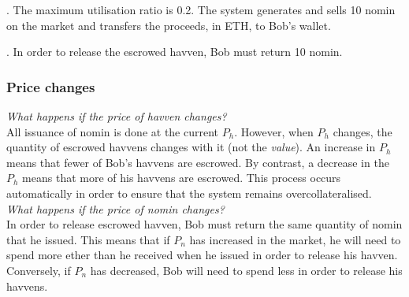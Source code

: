 \begin{center}
\end{center}

. The maximum utilisation ratio is 0.2. The system generates and sells 10 nomin on the market and transfers the proceeds, in ETH, to Bob's wallet. \\

\begin{center}
\end{center}

. In order to release the escrowed havven, Bob must return 10 nomin.

\begin{center}
\end{center}

\subsubsection{Price changes}

\noindent \emph{What happens if the price of havven changes?} \\

\noindent All issuance of nomin is done at the current $P_h$. However, when $P_h$ changes, the quantity of escrowed havvens changes with it (not the \emph{value}). An increase in $P_h$ means that fewer of Bob's havvens are escrowed. By contrast, a decrease in the $P_h$ means that more of his havvens are escrowed. This process occurs automatically in order to ensure that the system remains overcollateralised. \\ 

\noindent \emph{What happens if the price of nomin changes?} \\ 

\noindent In order to release escrowed havven, Bob must return the same quantity of nomin that he issued. This means that if $P_n$ has increased in the market, he will need to spend more ether than he received when he issued in order to release his havven. Conversely, if $P_n$ has decreased, Bob will need to spend less in order to release his havvens.

